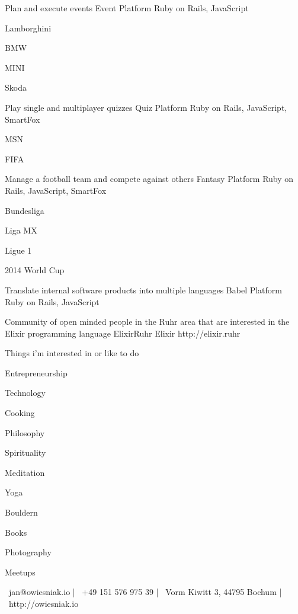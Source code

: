 \documentclass[]{awesome-cv}
\begin{document}
\begin{cventries}
	\cventry
	{Plan and execute events}
	{Event Platform}
	{Ruby on Rails, JavaScript}
	{}
	{\begin{cvitems}
		\item {Lamborghini}
		\item {BMW}
		\item {MINI}
		\item {Skoda}
	\end{cvitems}}
	
	\vspace{-2mm}
	\cventry
	{Play single and multiplayer quizzes}
	{Quiz Platform}
	{Ruby on Rails, JavaScript, SmartFox}
	{}
	{\begin{cvitems}
		\item {MSN}
		\item {FIFA}
	\end{cvitems}}
	
	\vspace{-2mm}
	\cventry
	{Manage a football team and compete against others}
	{Fantasy Platform}
	{Ruby on Rails, JavaScript, SmartFox}
	{}
	{\begin{cvitems}
		\item {Bundesliga}
		\item {Liga MX}
		\item {Ligue 1}
		\item {2014 World Cup}
	\end{cvitems}}
	
	\vspace{-2mm}
	\cventry
	{Translate internal software products into multiple languages}
	{Babel Platform}
	{Ruby on Rails, JavaScript}
	{}
	{}
	
	\vspace{-2mm}
	\cventry
	{Community of open minded people in the Ruhr area that are interested in the Elixir programming language}
	{ElixirRuhr}
	{Elixir}
	{http://elixir.ruhr}
	{}
\end{cventries}

\vspace{-2mm}
\begin{cventries}
	\cventry
	{Things i'm interested in or like to do}
	{}
	{}
	{}
	{\begin{cvitems}
		\item {Entrepreneurship}
		\item {Technology}
		\item {Cooking}
		\item {Philosophy}
		\item {Spirituality}
		\item {Meditation}
		\item {Yoga}
		\item {Bouldern}
		\item {Books}
		\item {Photography}
		\item {Meetups}
		\end{cvitems}}
\end{cventries}
    
 \begin{center}
	\vspace{\fill}
	{\faEnvelope\ jan@owiesniak.io} | {\faMobile\ +49 151 576 975 39} | {\faMapMarker\ Vorm Kiwitt 3, 44795 Bochum} | {\faLink\ http://owiesniak.io}
\end{center}
\ 
\end{document}
